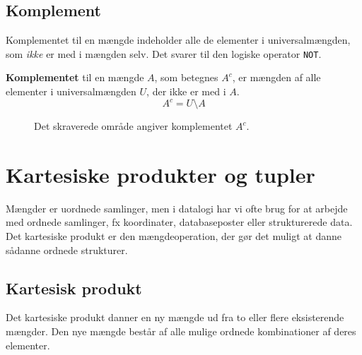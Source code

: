 \subsection*{Komplement}
Komplementet til en mængde indeholder alle de elementer i universalmængden, som \textit{ikke} er med i mængden selv. Det svarer til den logiske operator \texttt{NOT}.

\begin{definition}[Komplement]
    \textbf{Komplementet} til en mængde $A$, som betegnes $A^c$, er mængden af alle elementer i universalmængden $U$, der ikke er med i $A$.
    \[ A^c = U \setminus A \]
\end{definition}

\begin{figure}[htbp]
    \centering
    \caption{Det skraverede område angiver komplementet $A^c$.}
    \label{fig:complement_custom}
\end{figure}

\section{Kartesiske produkter og tupler}
Mængder er uordnede samlinger, men i datalogi har vi ofte brug for at arbejde med ordnede samlinger, fx koordinater, databaseposter eller strukturerede data. Det kartesiske produkt er den mængdeoperation, der gør det muligt at danne sådanne ordnede strukturer.

\subsection*{Kartesisk produkt}
Det kartesiske produkt danner en ny mængde ud fra to eller flere eksisterende mængder. Den nye mængde består af alle mulige ordnede kombinationer af deres elementer.


